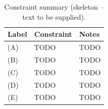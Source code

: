 \begin{table}
\centering
\caption{Constraint summary (skeleton -- text to be supplied).}
\label{tab-constraints}
\begin{tabular}{l l l}
\toprule
Label & Constraint & Notes \\
\midrule
(A) & TODO & TODO \\
(B) & TODO & TODO \\
(C) & TODO & TODO \\
(D) & TODO & TODO \\
(E) & TODO & TODO \\
\bottomrule
\end{tabular}
\end{table}
